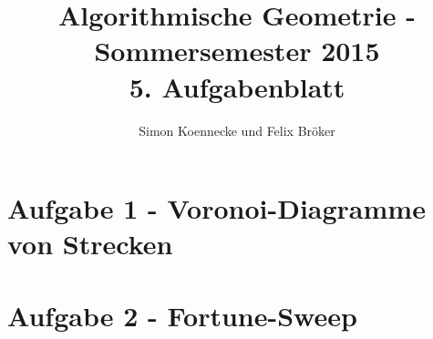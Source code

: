 \documentclass[a4paper]{article}
\begin{document}
\title{Algorithmische Geometrie - Sommersemester 2015\\
       5. Aufgabenblatt }
\author{Simon Koennecke und Felix Bröker}
\date{}
\maketitle

\section*{Aufgabe 1 - Voronoi-Diagramme von Strecken}

\section*{Aufgabe 2 - Fortune-Sweep}
\end{document}
